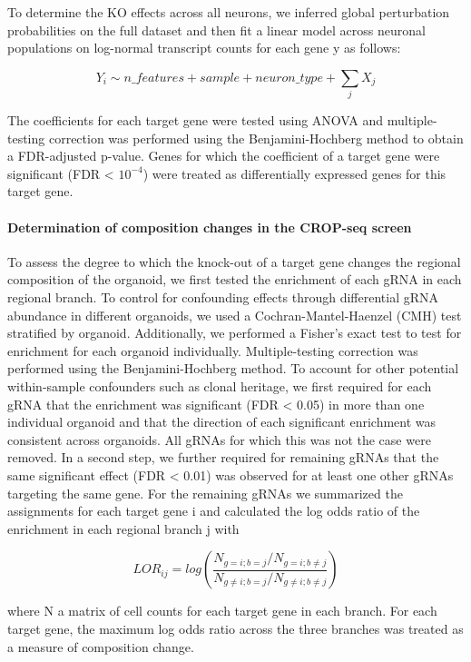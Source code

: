 To determine the KO effects across all neurons, we inferred global perturbation probabilities on the full dataset and then fit a linear model across neuronal populations on log-normal transcript counts for each gene y as follows:
 
\[ Y_i \sim n\_features + sample + neuron\_type + \sum_j X_j \]
 
The coefficients for each target gene were tested using ANOVA and multiple-testing correction was performed using the Benjamini-Hochberg method to obtain a FDR-adjusted p-value. Genes for which the coefficient of a target gene were significant (FDR < $10^{-4}$) were treated as differentially expressed genes for this target gene.
 
 
\paragraph{Determination of composition changes in the CROP-seq screen}
To assess the degree to which the knock-out of a target gene changes the regional composition of the organoid, we first tested the enrichment of each gRNA in each regional branch. To control for confounding effects through differential gRNA abundance in different organoids, we used a Cochran-Mantel-Haenzel (CMH) test stratified by organoid. Additionally, we performed a Fisher's exact test to test for enrichment for each organoid individually. Multiple-testing correction was performed using the Benjamini-Hochberg method. To account for other potential within-sample confounders such as clonal heritage, we first required for each gRNA that the enrichment was significant (FDR < 0.05) in more than one individual organoid and that the direction of each significant enrichment was consistent across organoids. All gRNAs for which this was not the case were removed. In a second step, we further required for remaining gRNAs that the same significant effect (FDR < 0.01) was observed for at least one other gRNAs targeting the same gene. For the remaining gRNAs we summarized the assignments for each target gene i  and calculated the log odds ratio of the enrichment in each regional branch j with
 
\[ LOR_{ij} = log(\frac{N_{g=i;b=j} / N_{g=i;b\neq j}} {N_{g\neq i;b=j} / N_{g\neq i;b\neq j}} ) \]   
 
where N a matrix of cell counts for each target gene in each branch. For each target gene, the maximum log odds ratio across the three branches was treated as a measure of composition change.
 
